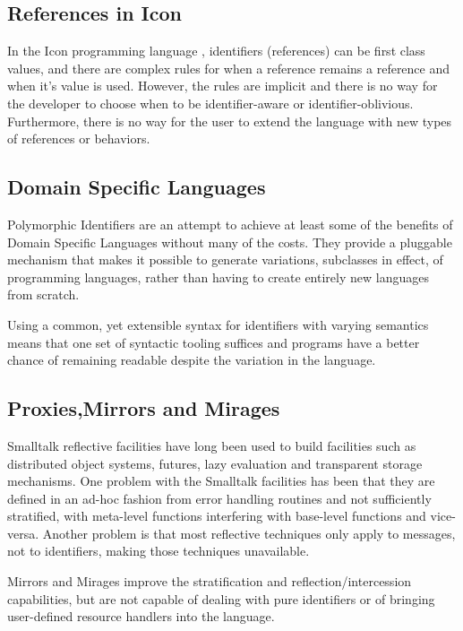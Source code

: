 \documentclass[preprint,authoryear]{acm_proc_article-sp}
\begin{document}
\subsection{References in Icon}

In the Icon programming language \cite{IconRef} , identifiers (references) can be first class values,
and there are complex rules for when a reference remains a reference and when
it's value is used.  However, the rules are implicit and there is no way for the 
developer to choose when to be identifier-aware or identifier-oblivious.  Furthermore,
there is no way for the user to extend the language with new types of references 
or behaviors.



\subsection{Domain Specific Languages}

Polymorphic Identifiers are an attempt to achieve at least some of the benefits
of Domain Specific Languages without many of the costs.  They provide a
pluggable mechanism that makes it possible to generate variations, subclasses
in effect, of programming languages, rather than having to create entirely new languages
from scratch.

Using a common, yet extensible syntax for identifiers with varying semantics means
that one set of syntactic tooling suffices and programs have a better chance of
remaining readable despite the variation in the language.


\subsection{Proxies,Mirrors and Mirages}

Smalltalk reflective facilities \cite{reflective-st} have long been used to build
facilities such as distributed object systems, futures, lazy evaluation and
transparent storage mechanisms.  One problem with the Smalltalk facilities
has been that they are defined in an ad-hoc fashion from error handling routines
and not sufficiently stratified, with meta-level functions
interfering with base-level functions and vice-versa.  Another problem is that
most reflective techniques only apply to messages, not to identifiers, making 
those techniques unavailable.

Mirrors \cite{mirrors} and Mirages \cite{mirages} improve the stratification and
reflection/intercession capabilities, but are not capable of dealing with pure
identifiers or of bringing user-defined resource handlers into the language.
\end{document}
